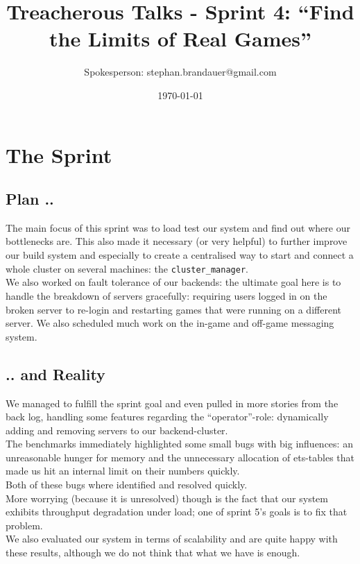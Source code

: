 \documentclass[11pt,a4paper]{article}
\begin{document}
\title{Treacherous Talks -
  Sprint 4: ``Find the Limits of Real Games''}
\date{\today}
\author{Spokesperson: stephan.brandauer@gmail.com}
\maketitle

\section{The Sprint}
\subsection{Plan ..}
The main focus of this sprint was to load test our system and find out where
our bottlenecks are. This also made it necessary (or very helpful) to further
improve our build system and especially to create a centralised way to start
and connect a whole cluster on several machines: the {\tt cluster\_manager}. \\
We also worked on fault tolerance of our backends: the ultimate goal here is
to handle the breakdown of servers gracefully: requiring users logged in on the
broken server to re-login and restarting games that were running on a different
server. We also scheduled much work on the in-game and off-game messaging system.

\subsection{.. and Reality}
We managed to fulfill the sprint goal and even pulled in more stories from
the back log, handling some features regarding the ``operator''-role:
dynamically adding and removing servers to our backend-cluster. \\
The benchmarks immediately highlighted some small bugs with big influences:
an unreasonable hunger for memory and the unnecessary allocation of ets-tables
that made us hit an internal limit on their numbers quickly. \\ Both of these
bugs where identified and resolved quickly. \\
More worrying (because it is unresolved) though is the fact that our system exhibits throughput
degradation under load; one of sprint 5's goals is to fix that problem. \\
We also evaluated our system in terms of scalability and are quite happy with
these results, although we do not think that what we have is enough.
\end{document}
